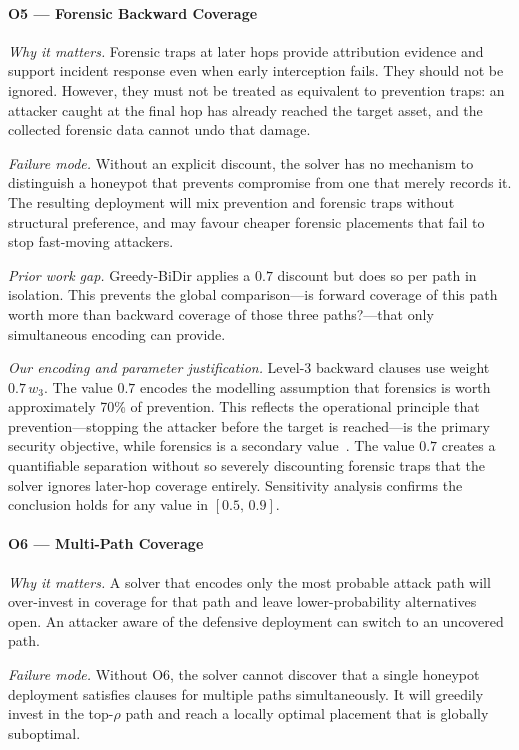 \documentclass[journal]{IEEEtran}
\begin{document}
\paragraph{O5 --- Forensic Backward Coverage}
\textit{Why it matters.}
Forensic traps at later hops provide attribution evidence and
support incident response even when early interception fails. They
should not be ignored. However, they must not be treated as
equivalent to prevention traps: an attacker caught at the final hop
has already reached the target asset, and the collected forensic
data cannot undo that damage.

\textit{Failure mode.}
Without an explicit discount, the solver has no mechanism to
distinguish a honeypot that prevents compromise from one that merely
records it. The resulting deployment will mix prevention and forensic
traps without structural preference, and may favour cheaper forensic
placements that fail to stop fast-moving attackers.

\textit{Prior work gap.}
Greedy-BiDir applies a $0.7$ discount but does so per path in
isolation. This prevents the global comparison---is forward coverage
of this path worth more than backward coverage of those three
paths?---that only simultaneous encoding can provide.

\textit{Our encoding and parameter justification.}
Level-3 backward clauses use weight $0.7\,w_3$. The value $0.7$
encodes the modelling assumption that forensics is worth approximately
70\% of prevention. This reflects the operational principle that
prevention---stopping the attacker before the target is reached---is
the primary security objective, while forensics is a secondary
value~\cite{hutchins2011}. The value $0.7$ creates a quantifiable
separation without so severely discounting forensic traps that the
solver ignores later-hop coverage entirely. Sensitivity analysis
confirms the conclusion holds for any value in $[0.5,\,0.9]$.

\paragraph{O6 --- Multi-Path Coverage}
\textit{Why it matters.}
A solver that encodes only the most probable attack path will
over-invest in coverage for that path and leave lower-probability
alternatives open. An attacker aware of the defensive deployment can
switch to an uncovered path.

\textit{Failure mode.}
Without O6, the solver cannot discover that a single honeypot
deployment satisfies clauses for multiple paths simultaneously. It
will greedily invest in the top-$\rho$ path and reach a locally
optimal placement that is globally suboptimal.
\end{document}
